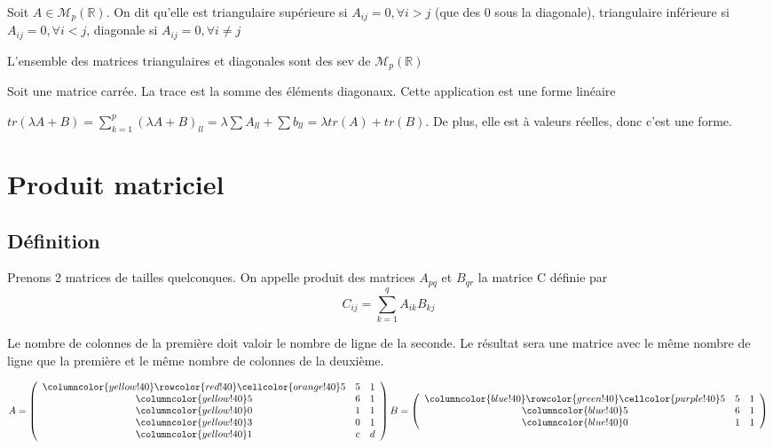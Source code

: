 \documentclass[french]{yLectureNote}
\newcommand{\R}[0]{\mathbb{R}}
\newcommand{\mc}{\mathcal}
\begin{document}
\begin{definition}
Soit \(A\in \mc{M}_p(\R)\). On dit qu'elle est triangulaire supérieure si \(A_{ij}=0, \forall i>j\) (que des 0 sous la diagonale), triangulaire inférieure si \(A_{ij}=0, \forall i<j\), diagonale si \(A_{ij}=0, \forall i\neq j\)
\end{definition}
\begin{proposition}
L'ensemble des matrices triangulaires et diagonales sont des sev de \(\mc{M}_p(\R)\)
\end{proposition}
\begin{definition}[Trace]
Soit une matrice carrée. La trace est la somme des éléments diagonaux. Cette application est une forme linéaire
\end{definition}
\begin{myproof}
 \(tr(\lambda A+B) = \sum^p_{k=1}(\lambda A+B)_{ll} = \lambda \sum A_{ll}+\sum b_{ll}=\lambda tr(A)+tr(B)\). De plus, elle est à valeurs réelles, donc c'est une forme.
\end{myproof}
\section{Produit matriciel}
\subsection{Définition}
\begin{definition}
Prenons 2 matrices de tailles quelconques. On appelle produit des matrices \(A_{pq}\) et \(B_{qr}\) la matrice C définie par \[C_{ij} = \sum^{q}_{k=1} A_{ik}B_{kj}\]
\end{definition}
Le nombre de {\color{Red}colonnes de la premi\`ere} doit valoir le {\color{blue}nombre de ligne de la seconde}. Le r\'esultat sera une matrice avec le m\^eme {\color{orange}nombre de ligne que la premi\`ere} et le m\^eme {\color{green}nombre de colonnes de la deuxi\`eme}.

$A = \left(\begin{array}{>{\columncolor{yellow!40}}ccc}
    \rowcolor{red!40}
    \cellcolor{orange!40}5  & 5 & 1 \\
5  & 6 & 1 \\
0   & 1 & 1 \\
3   & 0  & 1 \\
1  &  c &  d\\
  \end{array}\right) B = \left(\begin{array}{>{\columncolor{blue!40}}ccc}
    \rowcolor{green!40}
    \cellcolor{purple!40}5  & 5 & 1 \\
5  & 6 & 1 \\
0   & 1 & 1 \\
  \end{array}\right)$
\end{document}
